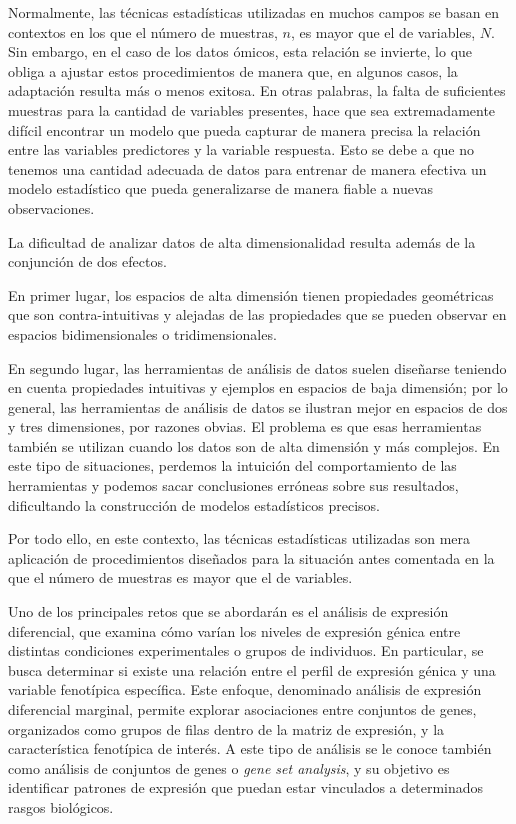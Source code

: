 Normalmente, las técnicas estadísticas utilizadas en muchos campos se basan en contextos en los que 
el número de muestras, $n$, es mayor que el de variables, $N$. Sin embargo, en el caso de los datos ómicos, esta relación se invierte,
lo que obliga a ajustar estos procedimientos de manera que, en algunos casos, la adaptación resulta más o menos exitosa. En otras palabras,
la falta de suficientes muestras para la cantidad de variables presentes, hace que sea extremadamente difícil encontrar un modelo que pueda capturar
de manera precisa la relación entre las variables predictores y la variable respuesta. Esto se debe a que no tenemos una cantidad adecuada 
de datos para entrenar de manera efectiva un modelo estadístico que pueda generalizarse de manera fiable a nuevas observaciones.

La dificultad de analizar datos de alta dimensionalidad resulta además de la conjunción de dos efectos.

En primer lugar, los espacios de alta dimensión tienen propiedades geométricas que son contra-intuitivas y alejadas de las propiedades
que se pueden observar en espacios bidimensionales o tridimensionales. 

En segundo lugar, las herramientas de análisis de datos suelen diseñarse teniendo en cuenta propiedades intuitivas
y ejemplos en espacios de baja dimensión; por lo general, las herramientas de análisis de datos se ilustran mejor en espacios de dos y 
tres dimensiones, por razones obvias. El problema es que esas herramientas también se utilizan cuando los datos son de alta dimensión y
más complejos. En este tipo de situaciones, perdemos la intuición del comportamiento de las herramientas y podemos sacar conclusiones erróneas
sobre sus resultados, dificultando la construcción de modelos estadísticos precisos. \newline

Por todo ello, en este contexto, las técnicas estadísticas utilizadas son mera aplicación de procedimientos diseñados para la situación antes comentada en la 
que el número de muestras es mayor que el de variables. \newline

Uno de los principales retos que se abordarán es el análisis de expresión diferencial, 
que examina cómo varían los niveles de expresión génica entre distintas condiciones experimentales o grupos de individuos. En particular, se
busca determinar si existe una relación entre el perfil de expresión génica y una variable fenotípica específica. Este enfoque, denominado análisis
de expresión diferencial marginal, permite explorar asociaciones entre conjuntos de genes, organizados como grupos de filas dentro de la matriz de expresión, 
y la característica fenotípica de interés. A este tipo de análisis se le conoce también como análisis de conjuntos de genes o \textit{gene set analysis}, y 
su objetivo es identificar patrones de expresión que puedan estar vinculados a determinados rasgos biológicos. \newline

